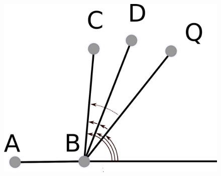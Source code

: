 \documentclass[18pt]{beamer}
\begin{document}
\begin{frame}
\begin{overprint}
\begin{figure}
\end{figure}

\begin{figure}
  \centering
  \includegraphics[scale=1.4 ]{Axiom5}

\end{figure}
\end{overprint}

\end{frame}
\end{document}
